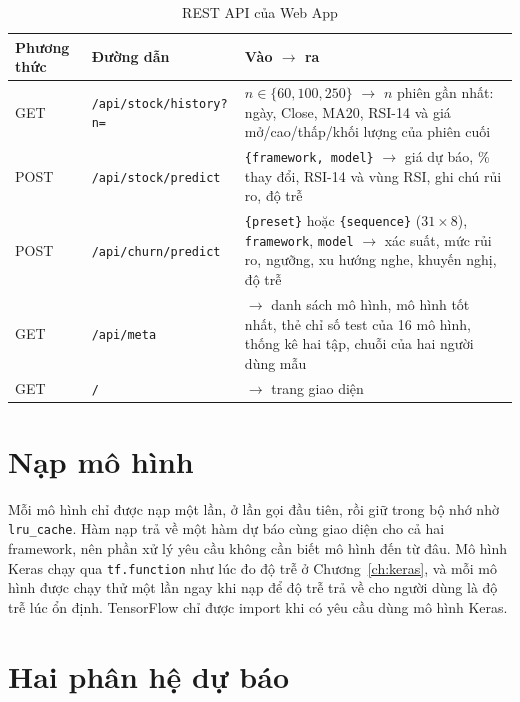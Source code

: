 \begin{table}[H]
  \centering\small
  \caption{REST API của Web App}
  \label{tab:api}
  \begin{tabular}{llL{7.2cm}}
    \toprule
    Phương thức & Đường dẫn & Vào $\to$ ra \\
    \midrule
    GET & \texttt{/api/stock/history?n=} & $n \in \{60, 100, 250\}$ $\to$ $n$ phiên gần nhất: ngày, Close, MA20,
                                          RSI-14 và giá mở/cao/thấp/khối lượng của phiên cuối \\
    POST & \texttt{/api/stock/predict} & \texttt{\{framework, model\}} $\to$ giá dự báo, \% thay đổi, RSI-14 và vùng
                                        RSI, ghi chú rủi ro, độ trễ \\
    POST & \texttt{/api/churn/predict} & \texttt{\{preset\}} hoặc \texttt{\{sequence\}} ($31\times8$), \texttt{framework},
                                        \texttt{model} $\to$ xác suất, mức rủi ro, ngưỡng, xu hướng nghe, khuyến nghị,
                                        độ trễ \\
    GET & \texttt{/api/meta} & $\to$ danh sách mô hình, mô hình tốt nhất, thẻ chỉ số test của 16 mô hình, thống kê
                               hai tập, chuỗi của hai người dùng mẫu \\
    GET & \texttt{/} & $\to$ trang giao diện \\
    \bottomrule
  \end{tabular}
\end{table}

\section{Nạp mô hình}

Mỗi mô hình chỉ được nạp một lần, ở lần gọi đầu tiên, rồi giữ trong bộ nhớ nhờ \texttt{lru\_cache}. Hàm nạp trả về một
hàm dự báo cùng giao diện cho cả hai framework, nên phần xử lý yêu cầu không cần biết mô hình đến từ đâu. Mô hình Keras
chạy qua \texttt{tf.function} như lúc đo độ trễ ở Chương~\ref{ch:keras}, và mỗi mô hình được chạy thử một lần ngay khi
nạp để độ trễ trả về cho người dùng là độ trễ lúc ổn định. TensorFlow chỉ được import khi có yêu cầu dùng mô hình Keras.


\section{Hai phân hệ dự báo}

